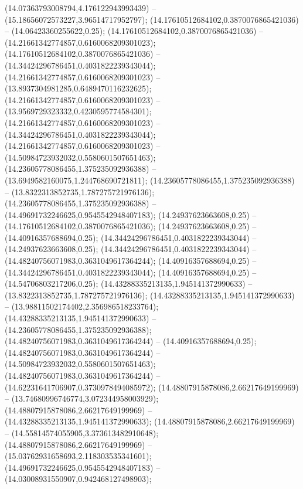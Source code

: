 (14.07363793008794,4.176122943993439) -- (15.18656072573227,3.96514717952797);
 (14.17610512684102,0.3870076865421036) -- (14.06423360255622,0.25);
 (14.17610512684102,0.3870076865421036) -- (14.21661342774857,0.6160068209301023);
 (14.17610512684102,0.3870076865421036) -- (14.34424296786451,0.4031822239343044);
 (14.21661342774857,0.6160068209301023) -- (13.8937304981285,0.6489470116232625);
 (14.21661342774857,0.6160068209301023) -- (13.9569729323332,0.4230595774584301);
 (14.21661342774857,0.6160068209301023) -- (14.34424296786451,0.4031822239343044);
 (14.21661342774857,0.6160068209301023) -- (14.50984723932032,0.5580601507651463);
 (14.23605778086455,1.375235092936388) -- (13.6949582160075,1.244768690721811);
 (14.23605778086455,1.375235092936388) -- (13.8322313852735,1.787275721976136);
 (14.23605778086455,1.375235092936388) -- (14.49691732246625,0.9545542948407183);
 (14.24937623663608,0.25) -- (14.17610512684102,0.3870076865421036);
 (14.24937623663608,0.25) -- (14.40916357688694,0.25);
 (14.34424296786451,0.4031822239343044) -- (14.24937623663608,0.25);
 (14.34424296786451,0.4031822239343044) -- (14.48240756071983,0.3631049617364244);
 (14.40916357688694,0.25) -- (14.34424296786451,0.4031822239343044);
 (14.40916357688694,0.25) -- (14.54706803217206,0.25);
 (14.43288335213135,1.945141372990633) -- (13.8322313852735,1.787275721976136);
 (14.43288335213135,1.945141372990633) -- (13.98811502174402,2.356986518233764);
 (14.43288335213135,1.945141372990633) -- (14.23605778086455,1.375235092936388);
 (14.48240756071983,0.3631049617364244) -- (14.40916357688694,0.25);
 (14.48240756071983,0.3631049617364244) -- (14.50984723932032,0.5580601507651463);
 (14.48240756071983,0.3631049617364244) -- (14.62231641706907,0.3730978494085972);
 (14.48807915878086,2.66217649199969) -- (13.74680996746774,3.072344958003929);
 (14.48807915878086,2.66217649199969) -- (14.43288335213135,1.945141372990633);
 (14.48807915878086,2.66217649199969) -- (14.55814574055905,3.373613482910648);
 (14.48807915878086,2.66217649199969) -- (15.03762931658693,2.118303535341601);
 (14.49691732246625,0.9545542948407183) -- (14.03008931550907,0.942468127498903);
